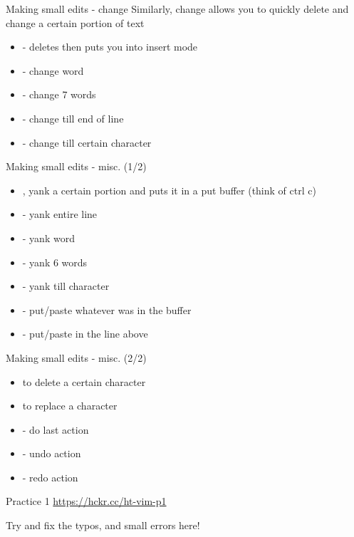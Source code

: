 \documentclass[12pt]{beamer}
\begin{document}
\begin{frame}{Making small edits - change}
    Similarly, change allows you to quickly delete and change a certain portion of text
    \begin{itemize}
        \item {} - deletes then puts you into insert mode
        \item {} - change word
        \item {} - change 7 words
        \item {} - change till end of line
        \item {} - change till certain character
    \end{itemize}{}
\end{frame}{}

\begin{frame}{Making small edits - misc. (1/2)}
    \begin{itemize}
        \item {}, yank a certain portion and puts it in a put buffer (think of ctrl c)
        \item {} - yank entire line
        \item {} - yank word
        \item {} - yank 6 words
        \item {} - yank till character
        \item {} - put/paste whatever was in the buffer
        \item {} - put/paste in the line above
    \end{itemize}{}
\end{frame}{}

\begin{frame}{Making small edits - misc. (2/2)}
    \begin{itemize}
        \item {} to delete a certain character
        \item {} to replace a character
        \item {} - do last action
        \item {} - undo action
        \item {} - redo action
    \end{itemize}{}
\end{frame}{}

\begin{frame}{Practice 1}
    \url{https://hckr.cc/ht-vim-p1}

    Try and fix the typos, and small errors here!
\end{frame}{}
\end{document}
